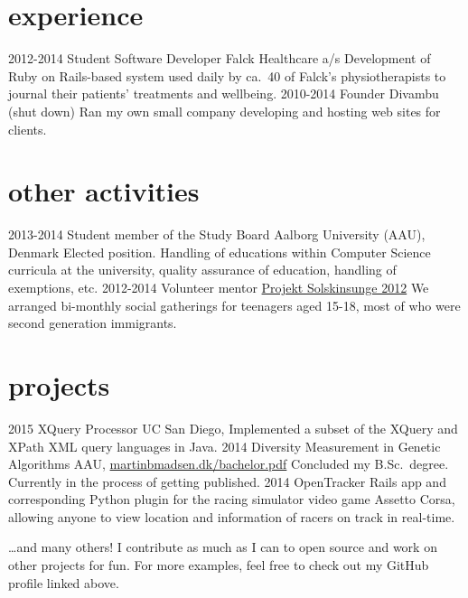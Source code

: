 \documentclass{afriggeri-cv/friggeri-cv}
\newcommand{\aau}{%
  Aalborg University (AAU), Denmark
}
\begin{document}
\section{experience}

\begin{entrylist}
  \entry
    {2012-2014}
    {Student Software Developer}
    {Falck Healthcare a/s}
    {Development of Ruby on Rails-based system used daily by ca.\ 40 of Falck's physiotherapists to journal their patients' treatments and wellbeing.}
  \entry
    {2010-2014}
    {Founder}
    {Divambu (shut down)}
    {Ran my own small company developing and hosting web sites for clients.}
\end{entrylist}

\section{other activities}
\begin{entrylist}
  \entry
    {2013-2014}
    {Student member of the Study Board}
    {\aau}
    {Elected position. Handling of educations within Computer Science curricula at the university, quality assurance of education, handling of exemptions, etc.}
  \entry
    {2012-2014}
    {Volunteer mentor}
    {\href{https://www.google.com/translate?hl=&sl=da&tl=en&u=http\%4A\%2F\%2Fwww.urk.dk\%2Funge-spreder-solskin&sandbox=1}{Projekt Solskinsunge 2012}}
    {We arranged bi-monthly social gatherings for teenagers aged 15-18, most of who were second generation immigrants.}
\end{entrylist}

\section{projects}
\begin{entrylist}
  \entry
    {2015}
    {XQuery Processor}
    {UC San Diego, }
    {Implemented a subset of the XQuery and XPath XML query languages in Java.}
  \entry
    {2014}
    {Diversity Measurement in Genetic Algorithms}
    {AAU, \href{http://martinbmadsen.dk/bachelor.pdf}{martinbmadsen.dk/bachelor.pdf}}
    {Concluded my B.Sc.\ degree. Currently in the process of getting published.}
  \entry
    {2014}
    {OpenTracker}
    {}
    {Rails app and corresponding Python plugin for the racing simulator video game Assetto Corsa, allowing anyone to view location and information of racers on track in real-time.}
\end{entrylist}

\dots and many others! I contribute as much as I can to open source and work on other projects for fun. For more examples, feel free to check out my GitHub profile linked above.
\end{document}
